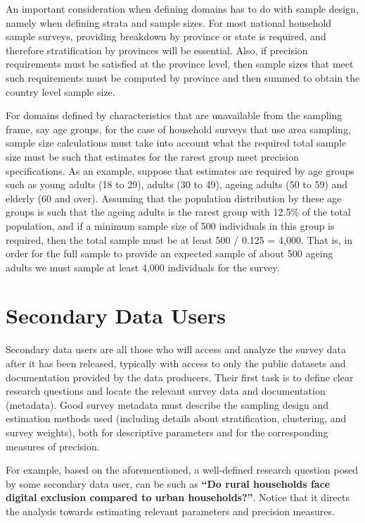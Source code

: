 \documentclass[
  12pt,
]{book}
\begin{document}
An important consideration when defining domains has to do with sample design, namely when defining strata and sample sizes. For most national household sample surveys, providing breakdown by province or state is required, and therefore stratification by provinces will be essential. Also, if precision requirements must be satisfied at the province level, then sample sizes that meet such requirements must be computed by province and then summed to obtain the country level sample size.

For domains defined by characteristics that are unavailable from the sampling frame, say age groups, for the case of household surveys that use area sampling, sample size calculations must take into account what the required total sample size must be such that estimates for the rarest group meet precision specifications. As an example, suppose that estimates are required by age groups such as young adults (18 to 29), adults (30 to 49), ageing adults (50 to 59) and elderly (60 and over). Assuming that the population distribution by these age groups is such that the ageing adults is the rarest group with 12.5\% of the total population, and if a minimum sample size of 500 individuals in this group is required, then the total sample must be at least 500 / 0.125 = 4,000. That is, in order for the full sample to provide an expected sample of about 500 ageing adults we must sample at least 4,000 individuals for the survey.

\hypertarget{secondary-data-users}{%
\section{Secondary Data Users}\label{secondary-data-users}}

Secondary data users are all those who will access and analyze the survey data after it has been released, typically with access to only the public datasets and documentation provided by the data producers. Their first task is to define clear research questions and locate the relevant survey data and documentation (metadata). Good survey metadata must describe the sampling design and estimation methods used (including details about stratification, clustering, and survey weights), both for descriptive parameters and for the corresponding measures of precision.

For example, based on the aforementioned, a well-defined research question posed by some secondary data user, can be such as \textbf{``Do rural households face digital exclusion compared to urban households?''}. Notice that it directs the analysis towards estimating relevant parameters and precision measures.
\end{document}
